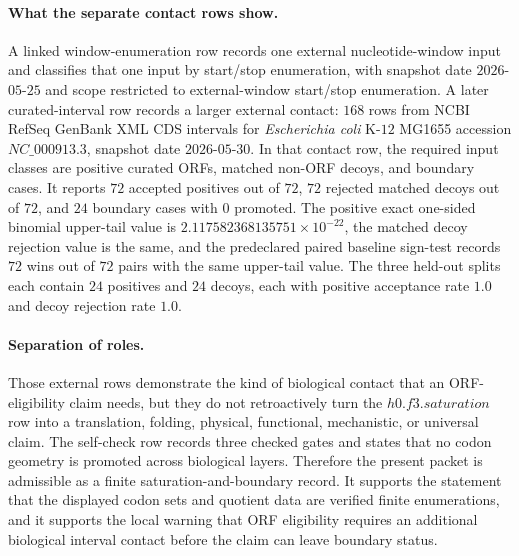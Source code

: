 \paragraph{What the separate contact rows show.}
A linked window-enumeration row records one external nucleotide-window input and classifies that one input by start/stop enumeration, with snapshot date $2026$-$05$-$25$ and scope restricted to external-window start/stop enumeration.  A later curated-interval row records a larger external contact: $168$ rows from NCBI RefSeq GenBank XML CDS intervals for \emph{Escherichia coli} K-$12$ MG1655 accession $NC\_000913.3$, snapshot date $2026$-$05$-$30$.  In that contact row, the required input classes are positive curated ORFs, matched non-ORF decoys, and boundary cases.  It reports $72$ accepted positives out of $72$, $72$ rejected matched decoys out of $72$, and $24$ boundary cases with $0$ promoted.  The positive exact one-sided binomial upper-tail value is $2.117582368135751\times 10^{-22}$, the matched decoy rejection value is the same, and the predeclared paired baseline sign-test records $72$ wins out of $72$ pairs with the same upper-tail value.  The three held-out splits each contain $24$ positives and $24$ decoys, each with positive acceptance rate $1.0$ and decoy rejection rate $1.0$.

\paragraph{Separation of roles.}
Those external rows demonstrate the kind of biological contact that an ORF-eligibility claim needs, but they do not retroactively turn the $h0.f3.saturation$ row into a translation, folding, physical, functional, mechanistic, or universal claim.  The self-check row records three checked gates and states that no codon geometry is promoted across biological layers.  Therefore the present packet is admissible as a finite saturation-and-boundary record.  It supports the statement that the displayed codon sets and quotient data are verified finite enumerations, and it supports the local warning that ORF eligibility requires an additional biological interval contact before the claim can leave boundary status.